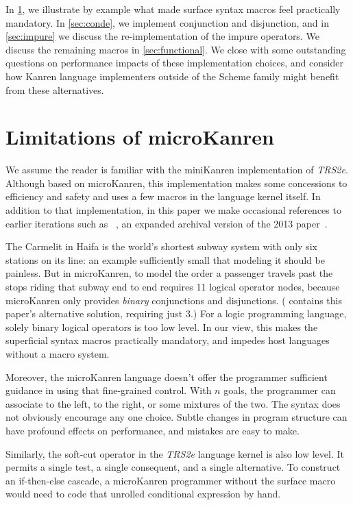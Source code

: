 \documentclass[sigplan,balance,pbalance,natbib=false]{acmart}
\begin{document}
In \cref{sec:all-aboard}, we illustrate by example what made surface
syntax macros feel practically mandatory. In \cref{sec:conde}, we
implement conjunction and disjunction, and in \cref{sec:impure} we
discuss the re-implementation of the impure operators. We discuss the
remaining macros in \cref{sec:functional}. We close with some
outstanding questions on performance impacts of these implementation
choices, and consider how Kanren language implementers outside of the
Scheme family might benefit from these alternatives.

\section{Limitations of microKanren}\label{sec:all-aboard}

We assume the reader is familiar with the miniKanren implementation of
\emph{TRS2e}. Although based on microKanren, this implementation makes
some concessions to efficiency and safety and uses a few macros in the
language kernel itself. In addition to that implementation, in this
paper we make occasional references to earlier iterations such as
\citeauthor{hemann2016small}~\cite{hemann2016small}, an expanded
archival version of the 2013 paper~\cite{hemann2013muKanren}.

The Carmelit in Haifa is the world's shortest subway system with only
six stations on its line: an example sufficiently small that modeling
it should be painless. But in microKanren, to model the order a
passenger travels past the stops riding that subway end to end
requires 11 logical operator nodes, because microKanren only provides
\emph{binary} conjunctions and disjunctions. (
contains this paper's alternative solution, requiring just 3.) For a
logic programming language, solely binary logical operators is too low
level. In our view, this makes the superficial syntax macros
practically mandatory, and impedes host languages without a macro
system.

Moreover, the microKanren language doesn't offer the programmer
sufficient guidance in using that fine-grained control. With $n$
goals, the programmer can associate to the left, to the right, or some
mixtures of the two. The syntax does not obviously encourage any one
choice. Subtle changes in program structure can have profound effects
on performance, and mistakes are easy to make.

Similarly, the soft-cut operator  in the \emph{TRS2e}
language kernel is also low level. It permits a single test, a single
consequent, and a single alternative. To construct an if-then-else
cascade, a microKanren programmer without the 
surface macro would need to code that unrolled conditional expression
by hand.
\end{document}
